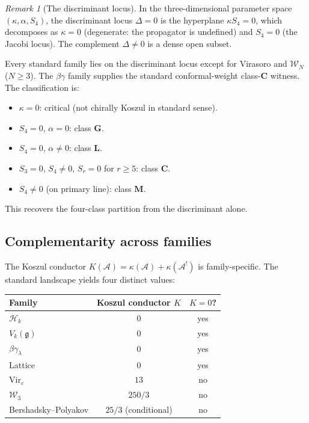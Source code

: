 \documentclass[11pt,reqno]{amsart}
\theoremstyle{definition}
\theoremstyle{remark}
\newtheorem{remark}[theorem]{Remark}
\newcommand{\cA}{\mathcal{A}}
\newcommand{\cH}{\mathcal{H}}
\newcommand{\cW}{\mathcal{W}}
\newcommand{\fg}{\mathfrak{g}}
\newcommand{\Vir}{\mathrm{Vir}}
\numberwithin{equation}{section}
\begin{document}
\begin{remark}[The discriminant
locus]\label{rem:disc-locus}
In the three-dimensional parameter space $(\kappa, \alpha,
S_4)$, the discriminant locus $\Delta = 0$ is the
hyperplane $\kappa S_4 = 0$, which decomposes as
$\kappa = 0$ (degenerate: the propagator is undefined)
and $S_4 = 0$ (the Jacobi locus). The complement
$\Delta \ne 0$ is a dense open subset.

Every standard family lies on the discriminant locus
except for Virasoro and $\cW_N$ ($N \ge 3$). The
$\beta\gamma$ family supplies the standard conformal-weight
class-$\mathbf{C}$ witness. The classification is:
\begin{itemize}
\item $\kappa = 0$: critical (not chirally Koszul in
 standard sense).
\item $S_4 = 0$, $\alpha = 0$: class $\mathbf{G}$.
\item $S_4 = 0$, $\alpha \ne 0$: class $\mathbf{L}$.
\item $S_3 = 0$, $S_4 \ne 0$, $S_r = 0$ for $r \ge 5$:
 class $\mathbf{C}$.
\item $S_4 \ne 0$ (on primary line): class $\mathbf{M}$.
\end{itemize}
This recovers the four-class partition from the discriminant
alone.
\end{remark}


\subsection{Complementarity across families}
\label{subsec:comp-families}

The Koszul conductor $K(\cA) = \kappa(\cA) + \kappa(\cA^!)$
is family-specific. The standard landscape yields four
distinct values:

\begin{center}
\renewcommand{\arraystretch}{1.3}
\begin{tabular}{lcc}
\toprule
Family & Koszul conductor $K$ & $K = 0$? \\
\midrule
$\cH_k$ & $0$ & yes \\
$V_k(\fg)$ & $0$ & yes \\
$\beta\gamma_\lambda$ & $0$ & yes \\
Lattice & $0$ & yes \\
\addlinespace
$\Vir_c$ & $13$ & no \\
$\cW_3$ & $250/3$ & no \\
Bershadsky--Polyakov & $25/3$ (conditional) & no \\
\bottomrule
\end{tabular}
\end{center}
\end{document}
